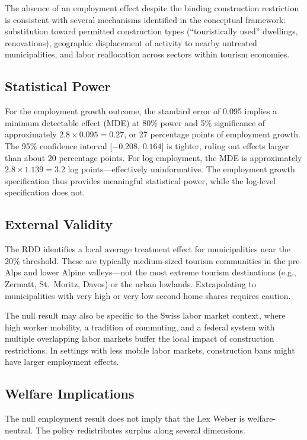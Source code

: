 \documentclass[12pt]{article}
\begin{document}
The absence of an employment effect despite the binding construction restriction is consistent with several mechanisms identified in the conceptual framework: substitution toward permitted construction types (``touristically used'' dwellings, renovations), geographic displacement of activity to nearby untreated municipalities, and labor reallocation across sectors within tourism economies.

\subsection{Statistical Power}

For the employment growth outcome, the standard error of 0.095 implies a minimum detectable effect (MDE) at 80\% power and 5\% significance of approximately $2.8 \times 0.095 = 0.27$, or 27 percentage points of employment growth. The 95\% confidence interval [$-0.208$, $0.164$] is tighter, ruling out effects larger than about 20 percentage points. For log employment, the MDE is approximately $2.8 \times 1.139 = 3.2$ log points---effectively uninformative. The employment growth specification thus provides meaningful statistical power, while the log-level specification does not.

\subsection{External Validity}

The RDD identifies a local average treatment effect for municipalities near the 20\% threshold. These are typically medium-sized tourism communities in the pre-Alps and lower Alpine valleys---not the most extreme tourism destinations (e.g., Zermatt, St.\ Moritz, Davos) or the urban lowlands. Extrapolating to municipalities with very high or very low second-home shares requires caution.

The null result may also be specific to the Swiss labor market context, where high worker mobility, a tradition of commuting, and a federal system with multiple overlapping labor markets buffer the local impact of construction restrictions. In settings with less mobile labor markets, construction bans might have larger employment effects.

\subsection{Welfare Implications}

The null employment result does not imply that the Lex Weber is welfare-neutral. The policy redistributes surplus along several dimensions.
\end{document}
